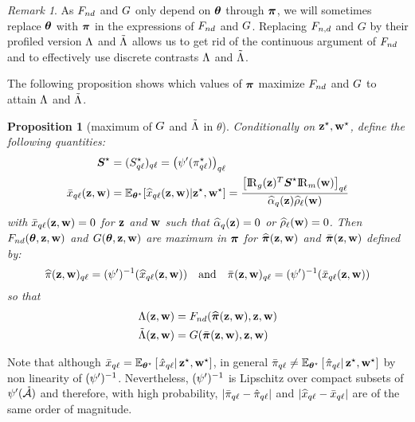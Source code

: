 \documentclass[bj]{imsart}
\numberwithin{equation}{section}
\theoremstyle{plain}
\newtheorem{proposition}[thm]{Proposition}
\theoremstyle{remark}
\newtheorem{rem}[thm]{Remark}
\begin{document}
\begin{rem}
As  $F_{nd}$ and $G$ only depend on $\boldsymbol{\theta}$ through $\boldsymbol{\pi}$, we will sometimes replace $\boldsymbol{\theta}$ with $\boldsymbol{\pi}$ in the expressions of $F_{nd}$ and $G$. Replacing $F_{n,d}$ and $G$ by their profiled version $\Lambda$ and $\tilde{\Lambda}$ allows us to get rid of the continuous argument of $F_{nd}$ and to effectively use discrete contrasts $\Lambda$ and $\tilde{\Lambda}$.
\end{rem}

The following proposition shows which values of $\boldsymbol{\pi}$ maximize $F_{nd}$ and $G$ to attain $\Lambda$ and $\tilde{\Lambda}$.
\begin{proposition}[maximum of $G$ and $\tilde{\Lambda}$ in $\theta$]
\label{prop:profile-likelihood}
Conditionally on  $\mathbf{z}^\star, \mathbf{w}^\star$, define
 the following quantities:
\begin{equation}
  \label{eq:profile-likelihood-notations}
  \begin{aligned}
    \Sal & = (\Salkl)_{\kk\el} = \left( \normp(\alskl) \right)_{\kk\el} \\
    \barxkl(\bz, \bw) & = \Esp_{\bthetas}[\hxklzw | \bzs, \bws] = \frac{\left[ \Rgbz\transpose \Sal \Rmbw \right]_{\kk\el}}{\pizk\rhowl}
  \end{aligned}
\end{equation}
with $\bar{x}_{q\ell}(\mathbf{z}, \mathbf{w})=0$ for $\mathbf{z}$ and $\mathbf{w}$ such that $\widehat{\alpha}_{q}(\mathbf{z})=0$ or $\widehat{\rho}_{\ell}(\mathbf{w})=0$. 
Then $F_{nd}(\boldsymbol{\theta}, \mathbf{z}, \mathbf{w})$ and $G(\boldsymbol{\theta}, \mathbf{z}, \mathbf{w})$ are maximum in $\boldsymbol{\pi}$ for  $\widehat{\boldsymbol{\pi}}(\mathbf{z}, \mathbf{w})$ and $\bar{\boldsymbol{\pi}}(\mathbf{z}, \mathbf{w})$ defined by:
\begin{equation*}
  \hal(\bz, \bw)_{\kk\el} = \normpm ( \hxklzw ) \quad \text{and} \quad \bar{\al}(\bz, \bw)_{\kk\el} = \normpm ( \barxkl(\bz, \bw) )
\end{equation*}
so that
\begin{equation*}
  \begin{aligned}
    \Lamb(\bz, \bw) & = \Fnd(\hbal(\bz, \bw), \bz, \bw) %
    \\
    \Lambtilde(\bz, \bw) & = \G(\bar{\bal}(\bz, \bw), \bz, \bw) %
  \end{aligned}
\end{equation*}
\end{proposition}
Note that although $\bar{x}_{q\ell} = \mathbb{E}_{\boldsymbol{\theta}^\star}\left[\left.\hat{x}_{q\ell}\right|\mathbf{z}^\star,\mathbf{w}^\star\right]$, in general %
$\bar{\pi}_{q\ell} \neq \mathbb{E}_{\boldsymbol{\theta}^\star}\left[\left.\hat{\pi}_{q\ell}\right|\mathbf{z}^\star,\mathbf{w}^\star\right]$ by non linearity of $(\psi')^{-1}$. Nevertheless, $(\psi')^{-1}$ is Lipschitz over compact subsets of $\psi'(\mathring{\mathcal{A}})$ and therefore, with high probability, $|\bar{\pi}_{q\ell} - \hat{\pi}_{q\ell}|$ and $|\widehat{x}_{q\ell} - \bar{x}_{q\ell}|$ are of the same order of magnitude. 
\end{document}
